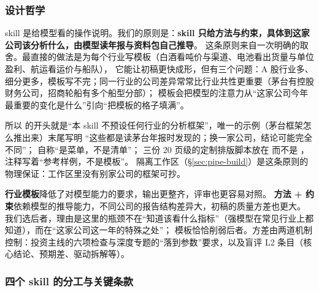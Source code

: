 \subsubsection{设计哲学}

skill 是给模型看的操作说明。我们的原则是：\textbf{skill 只给方法与约束，具体到这家公司该分析什么，由模型读年报与资料包自己推导}。
这条原则来自一次明确的取舍。最直接的做法是为每个行业写模板（白酒看吨价与渠道、电池看出货量与单位盈利、航运看运价与船队），
它能让初稿更快成形，但有三个问题：A 股行业多、细分更多，模板写不完；同一行业的公司差异常常比行业共性更重要（茅台有控股财务公司，招商轮船有多个船型分部）；
模板会把模型的注意力从“这家公司今年最重要的变化是什么”引向“把模板的格子填满”。

所以  的开头就是“本 skill 不预设任何行业的分析框架”，唯一的示例（茅台框架怎么推出来）末尾写明
“这些都是读茅台年报时发现的；换一家公司，结论可能完全不同”； 自称“是菜单，不是清单”；
三份 20 页级的定制排版脚本放在  而不是 ，注释写着“参考样例，不是模板”。
隔离工作区（\S\ref{sec:pipe-build}）是这条原则的物理保证：工作区里没有别家公司的框架可抄。

\begin{tradeoff}[：行业模板 vs 方法 + 约束]
\textbf{行业模板}降低了对模型能力的要求，输出更整齐，评审也更容易对照。
\textbf{方法 + 约束}依赖模型的推导能力，不同公司的报告结构差异大，初稿的质量方差也更大。
我们选后者，理由是这里的瓶颈不在“知道该看什么指标”（强模型在常见行业上都知道），而在“这家公司这一年的特殊之处”；
模板恰恰削弱后者。方差由两道机制控制：投资主线的六项检查与深度专题的“落到参数”要求，以及盲评 L2 条目（核心结论、预期差、驱动拆解等）。
\end{tradeoff}

\subsubsection{四个 skill 的分工与关键条款}

